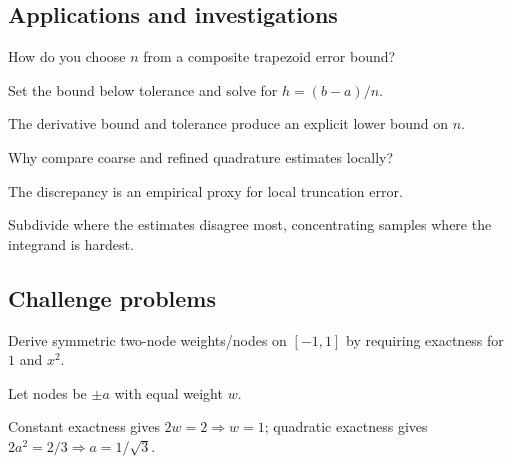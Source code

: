 \subsection*{Applications and investigations}

\begin{exercise}\label{exr:ii24-expand-13}
How do you choose \(n\) from a composite trapezoid error bound?
\end{exercise}
\begin{hint}
Set the bound below tolerance and solve for \(h=(b-a)/n\).
\end{hint}
\begin{solution}
The derivative bound and tolerance produce an explicit lower bound on \(n\).
\end{solution}

\begin{exercise}\label{exr:ii24-expand-14}
Why compare coarse and refined quadrature estimates locally?
\end{exercise}
\begin{hint}
The discrepancy is an empirical proxy for local truncation error.
\end{hint}
\begin{solution}
Subdivide where the estimates disagree most, concentrating samples where the integrand is hardest.
\end{solution}

\subsection*{Challenge problems}

\begin{exercise}\label{exr:ii24-expand-15}
Derive symmetric two-node weights/nodes on \([-1,1]\) by requiring exactness for \(1\) and \(x^2\).
\end{exercise}
\begin{hint}
Let nodes be \(\pm a\) with equal weight \(w\).
\end{hint}
\begin{solution}
Constant exactness gives \(2w=2\Rightarrow w=1\); quadratic exactness gives \(2a^2=2/3\Rightarrow a=1/\sqrt3\).
\end{solution}


